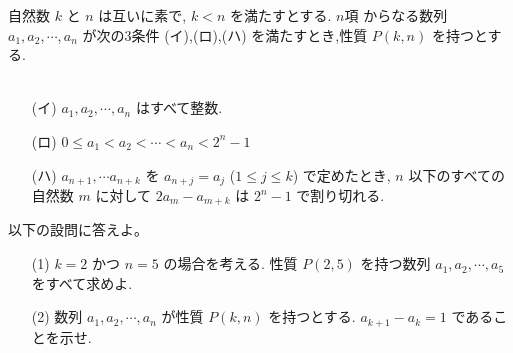 自然数 $k$ と $n$ は互いに素で, $k<n$ を満たすとする. $n$項 からなる数列 $a_1,a_2,\cdots,a_n$ が次の3条件 (イ),(ロ),(ハ) を満たすとき,性質 $P(k,n)$ を持つとする.\\
\\
\begin{itemize}
\item[(イ)] $a_1,a_2,\cdots,a_n$ はすべて整数.\\
\item[(ロ)] $0\le a_1<a_2<\cdots<a_n<2^n-1$\\
\item[(ハ)] $a_{n+1},\cdots a_{n+k}$ を $a_{n+j}=a_j$ ($1\le j\le k$) で定めたとき, $n$ 以下のすべての自然数 $m$ に対して $2a_m-a_{m+k}$ は $2^n-1$ で割り切れる.
\end{itemize} 
\indent 以下の設問に答えよ。\\
\begin{itemize}
\item[(1)] $k=2$ かつ $n=5$ の場合を考える. 性質 $P(2,5)$ を持つ数列 $a_1,a_2,\cdots,a_5$ をすべて求めよ.\\
\item[(2)] 数列 $a_1,a_2,\cdots,a_n$ が性質 $P(k,n)$ を持つとする. $a_{k+1}-a_k=1$ であることを示せ.
\end{itemize} 
\enthm
